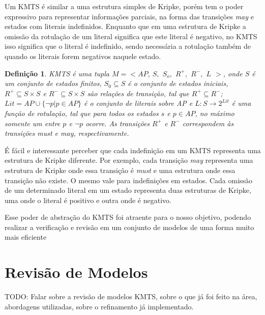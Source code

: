 \documentclass[normaltoc,capchap,capsec,times]{abnt}
\newtheorem{definition}{Definição}[section]
\begin{document}
Um KMTS é similar a uma estrutura simples de Kripke, porém tem o poder expressivo para representar informações parciais, na forma das transições \textit{may} e estados com literais indefinidos. Enquanto que em uma estrutura de Kripke a omissão da rotulação de um literal significa que este literal é negativo, no KMTS isso significa que o literal é indefinido, sendo necessária a rotulação também de quando os literais forem negativos naquele estado.

\begin{definition}\cite{aline}
\textnormal{KMTS é uma tupla $M = < AP$, $S,$ $S_o,$  $R^+,$ $R^-,$  $ L$ $ > $, onde $S$ é um conjunto de estados finitos, $S_0 \subseteq S$ é o conjunto de estados iniciais, $R^+ \subseteq S \times S$ e $R^- \subseteq S \times S$  são relações de transição, tal que $R^+ \subseteq R^-$; $Lit = {AP \cup \{ \neg p | p \in AP\}}$ é o conjunto de literais sobre AP e $L: S \to 2^{Lit}$ é uma função de rotulação, tal que para todos os estados $s$ e $p \in AP$, no máximo somente um entre $p$ e $\neg p$ ocorre. As transições $R^+$ e $R^-$ correspondem às transições \textit{must} e \textit{may}, respectivamente.
}
\end{definition}

É fácil e interessante perceber que cada indefinição em um KMTS representa uma estrutura de Kripke diferente. Por exemplo, cada transição \textit{may} representa uma estrutura de Kripke onde essa transição é \textit{must} e uma estrutura onde essa transição não existe. O mesmo vale para indefinições em estados. Cada omissão de um determinado literal em um estado representa duas estruturas de Kripke, uma onde o literal é positivo e outra onde é negativo.

Esse poder de abstração do KMTS foi atraente para o nosso objetivo, podendo realizar a verificação e revisão em um conjunto de modelos de uma forma muito mais eficiente

\chapter{Revisão de Modelos}
\label{cap:revisao}

TODO: Falar sobre a revisão de modelos KMTS, sobre o que já foi feito na área, abordagens utilizadas, sobre o refinamento já implementado.


\end{document}
